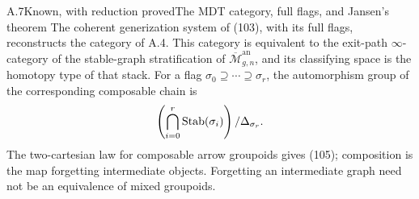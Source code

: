 \begin{result}{A.7}{Known, with reduction proved}{The MDT category, full flags, and Jansen's theorem}
The coherent generization system of (103), with its full flags, reconstructs the category of A.4. This category is equivalent to the exit-path $\infty$-category of the stable-graph stratification of $\overline{\mathcal M}_{g,n}^{\mathrm{an}}$, and its classifying space is the homotopy type of that stack. For a flag $\sigma_0\supseteq\cdots\supseteq\sigma_r$, the automorphism group of the corresponding composable chain is
\[
 \left(\bigcap_{i=0}^r\operatorname{Stab}(\sigma_i)\right)/\Delta_{\sigma_r}.
\]
The two-cartesian law for composable arrow groupoids gives (105); composition is the map forgetting intermediate objects. Forgetting an intermediate graph need not be an equivalence of mixed groupoids.
\end{result}

